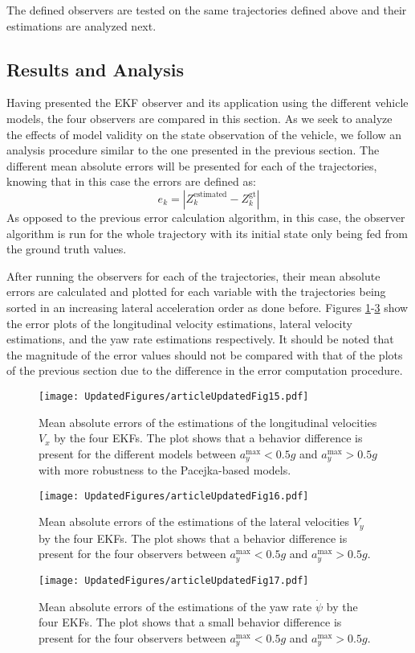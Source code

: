 \documentclass[journal]{IEEEtran}
\begin{document}
The defined observers are tested on the same trajectories defined above and their estimations are analyzed next.

\subsection{Results and Analysis}\label{EKF_res.ssec}
Having presented the EKF observer and its application using the different vehicle models, the four observers are compared in this section. As we seek to analyze the effects of model validity on the state observation of the vehicle, we follow an analysis procedure similar to the one presented in the previous section. The different mean absolute errors will be presented for each of the trajectories, knowing that in this case the errors are defined as: 
\begin{equation}
    e_k = |Z_k^{\text{estimated}} - Z_k^{\text{gt}}|
\end{equation}
As opposed to the previous error calculation algorithm, in this case, the observer algorithm is run for the whole trajectory with its initial state only being fed from the ground truth values. 

After running the observers for each of the trajectories, their mean absolute errors are calculated and plotted for each variable with the trajectories being sorted in an increasing lateral acceleration order as done before. Figures \ref{vx_obs.fig}-\ref{psidot_obs.fig} show the error plots of the longitudinal velocity estimations, lateral velocity estimations, and the yaw rate estimations respectively. It should be noted that the magnitude of the error values should not be compared with that of the plots of the previous section due to the difference in the error computation procedure. 

\begin{figure}[h]
    \centering
    \texttt{[image: UpdatedFigures/articleUpdatedFig15.pdf]}
    \caption{Mean absolute errors of the estimations of the longitudinal velocities $V_x$ by the four EKFs. The plot shows that a behavior difference is present for the different models between $a_y^{\text{max}}<0.5g$ and $a_y^{\text{max}}>0.5g$ with more robustness to the Pacejka-based models.}
    \label{vx_obs.fig}
\end{figure}
\begin{figure}[h]
    \centering
    \texttt{[image: UpdatedFigures/articleUpdatedFig16.pdf]}
    \caption{Mean absolute errors of the estimations of the lateral velocities $V_y$ by the four EKFs. The plot shows that a behavior difference is present for the four observers between $a_y^{\text{max}}<0.5g$ and $a_y^{\text{max}}>0.5g$.}
    \label{vy_obs.fig}
\end{figure}
\begin{figure}[h]
    \centering
    \texttt{[image: UpdatedFigures/articleUpdatedFig17.pdf]}
    \caption{Mean absolute errors of the estimations of the yaw rate $\dot\psi$ by the four EKFs. The plot shows that a small behavior difference is present for the four observers between $a_y^{\text{max}}<0.5g$ and $a_y^{\text{max}}>0.5g$.}
    \label{psidot_obs.fig}
\end{figure}
\end{document}
